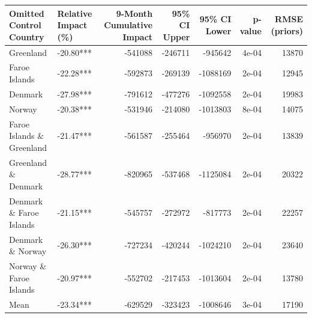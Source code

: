
\begin{tabular}[t]{l|l|r|r|r|r|r}
\hline
Omitted Control Country & Relative Impact (\%) & 9-Month Cumulative Impact & 95\% CI Upper & 95\% CI Lower & p-value & RMSE (priors)\\
\hline
Greenland & -20.80*** & -541088 & -246711 & -945642 & 4e-04 & 13870\\
\hline
Faroe Islands & -22.28*** & -592873 & -269139 & -1088169 & 2e-04 & 12945\\
\hline
Denmark & -27.98*** & -791612 & -477276 & -1092558 & 2e-04 & 19983\\
\hline
Norway & -20.38*** & -531946 & -214080 & -1013803 & 8e-04 & 14075\\
\hline
Faroe Islands \& Greenland & -21.47*** & -561587 & -255464 & -956970 & 2e-04 & 13839\\
\hline
Greenland \& Denmark & -28.77*** & -820965 & -537468 & -1125084 & 2e-04 & 20322\\
\hline
Denmark \& Faroe Islands & -21.15*** & -545757 & -272972 & -817773 & 2e-04 & 22257\\
\hline
Denmark \& Norway & -26.30*** & -727234 & -420244 & -1024210 & 2e-04 & 23640\\
\hline
Norway \& Faroe Islands & -20.97*** & -552702 & -217453 & -1013604 & 2e-04 & 13780\\
\hline
Mean & -23.34*** & -629529 & -323423 & -1008646 & 3e-04 & 17190\\
\hline
\end{tabular}

